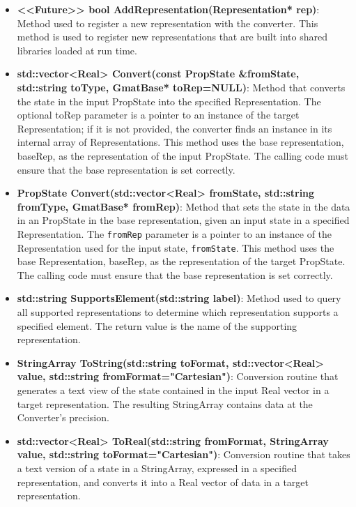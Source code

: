 \begin{itemize}
\item \textbf{<<Future>> bool AddRepresentation(Representation* rep)}: Method used to register a new
representation with the converter.  This method is used to register new representations that are
built into shared libraries loaded at run time.
\item \textbf{std::vector<Real> Convert(const PropState \&fromState, std::string toType, GmatBase*
toRep=NULL)}: Method that converts the state in the input PropState into the specified
Representation.  The optional toRep parameter is a pointer to an instance of the target
Representation; if it is not provided, the converter finds an instance in its internal array of
Representations.  This method uses the base representation, baseRep, as the representation of the
input PropState.  The calling code must ensure that the base representation is set correctly.
\item \textbf{PropState Convert(std::vector<Real> fromState, std::string fromType, GmatBase*
fromRep)}: Method that sets the state in the data in an PropState in the base representation,
given an input state in a specified Representation.  The \texttt{fromRep} parameter is a pointer to
an instance of the Representation used for the input state, \texttt{fromState}.  This method
uses the base Representation, baseRep, as the representation of the target PropState.  The calling
code must ensure that the base representation is set correctly.
\item \textbf{std::string SupportsElement(std::string label)}: Method used to query all supported
representations to determine which representation supports a specified element.  The return value
is the name of the supporting representation.
\item \textbf{StringArray ToString(std::string toFormat, std::vector<Real> value,
std::string fromFormat="Cartesian")}: Conversion routine that generates a text view of the state
contained in the input Real vector in a target representation.  The resulting StringArray contains
data at the Converter's precision.
\item \textbf{std::vector<Real> ToReal(std::string fromFormat, StringArray value,
std::string toFormat="Cartesian")}: Conversion routine that takes a text version of a state in
a StringArray, expressed in a specified representation, and converts it into a Real vector of data
in a target representation.
\end{itemize}


